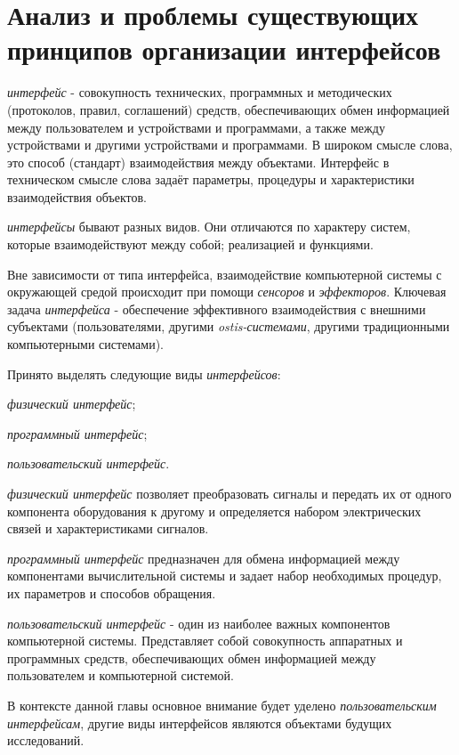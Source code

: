 \section{Анализ и проблемы существующих принципов организации интерфейсов}
\label{sec_analysis}

\textit{интерфейс} - совокупность технических, программных и методических (протоколов, правил, соглашений) средств, обеспечивающих обмен информацией между пользователем и устройствами и программами, а также между устройствами и другими устройствами и программами. В широком смысле слова, это способ (стандарт) взаимодействия между объектами. Интерфейс в техническом смысле слова задаёт параметры, процедуры и характеристики взаимодействия объектов.

\textit{интерфейсы} бывают разных видов. Они отличаются по характеру систем, которые взаимодействуют между собой; реализацией и функциями.

Вне зависимости от типа интерфейса, взаимодействие компьютерной системы с окружающей средой происходит при помощи \textit{сенсоров} и \textit{эффекторов}.
Ключевая задача \textit{интерфейса} - обеспечение эффективного взаимодействия с внешними субъектами (пользователями, другими \textit{ostis-системами}, другими традиционными компьютерными системами).

Принято выделять следующие виды \textit{интерфейсов}:
\begin{textitemize}
	\item \textit{физический интерфейс};
	\item \textit{программный интерфейс};
	\item \textit{пользовательский интерфейс}.
\end{textitemize}

\textit{физический интерфейс} позволяет преобразовать сигналы и передать их от одного компонента оборудования к другому и определяется набором электрических связей и характеристиками сигналов.

\textit{программный интерфейс} предназначен для обмена информацией между компонентами вычислительной системы и задает набор необходимых процедур, их параметров и способов обращения.

\textit{пользовательский интерфейс} - один из наиболее важных компонентов компьютерной системы. Представляет собой совокупность аппаратных и программных средств, обеспечивающих обмен информацией между пользователем и компьютерной системой.

В контексте данной главы основное внимание будет уделено \textit{пользовательским интерфейсам}, другие виды интерфейсов являются объектами будущих исследований.

